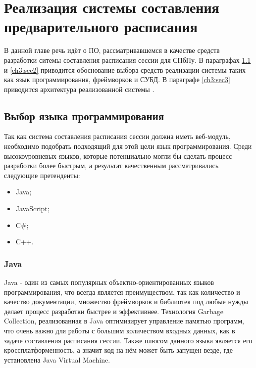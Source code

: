 \chapter{Реализация системы составления предварительного расписания} \label{ch3}
В данной главе речь идёт о ПО, рассматривавшемся в качестве средств разработки ситемы составления расписания сессии для СПбПу. В параграфах \ref{ch3:sec1} и \ref{ch3:sec2} приводится обоснование выбора средств реализации системы таких как язык программирования, фреймворков и СУБД. В параграфе \ref{ch3:sec3} приводится архитектура реализованной системы .
	
\section{Выбор языка программирования} \label{ch3:sec1}
Так как система составления расписания сессии должна иметь веб-модуль, необходимо подобрать подходящий для этой цели язык программирования. Среди высокоуровневых языков, которые потенциально могли бы сделать процесс разработки более быстрым, а результат качественным рассматривались следующие претенденты: 
\begin{itemize}
\item  Java;
\item  JavaScript;
\item  C\#;	
\item  C++.	
\end{itemize}

\subsection{Java}
Java - один из самых популярных объектно-ориентированных языков программирования, что всегда является преимуществом, так как количество и качество документации, множество фреймворков и библиотек под любые нужды делает процесс разработки быстрее и эффективнее. Технология Garbage Collection, реализованная в Java оптимизирует управление памятью программ, что очень важно для работы с большим количеством входных данных, как в задаче составления расписания сессии. Также плюсом данного языка является его кроссплатформенность, а значит код на нём может быть запущен везде, где установлена Java Virtual Machine. 

